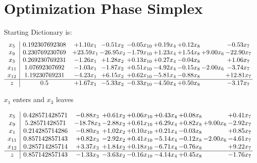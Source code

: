 \documentclass[9pt]{article}
\begin{document}
\section{Optimization Phase Simplex}
Starting Dictionary is:
\[\begin{array}{c| c c@{\hskip 2pt} c@{\hskip 2pt} c@{\hskip 2pt} c@{\hskip 2pt} c@{\hskip 2pt} c@{\hskip 2pt} c@{\hskip 2pt} }
 x_{5}   &  0.192307692308 & +  1.10 x_{1} & -0.51 x_{2} & -0.05 x_{10} & +  0.19 x_{4} & +  0.12 x_{8} &   & -0.53 x_{7}\\
 x_{9}   &  0.230769230769 & + 23.59 x_{1} & -26.95 x_{2} & -1.79 x_{10} & +  1.23 x_{4} & +  1.54 x_{8} & +  9.00 x_{6} & -22.90 x_{7}\\
 x_{3}   &  0.269230769231 & -1.26 x_{1} & +  1.28 x_{2} & +  0.13 x_{10} & +  0.27 x_{4} & -0.04 x_{8} &   & +  1.06 x_{7}\\
 x_{11}   &  1.07692307692 & -1.03 x_{1} & -1.87 x_{2} & +  0.51 x_{10} & -4.92 x_{4} & -0.15 x_{8} & -2.00 x_{6} & -3.74 x_{7}\\
 x_{12}   &  1.19230769231 & -4.23 x_{1} & +  6.15 x_{2} & +  0.62 x_{10} & -5.81 x_{4} & -0.88 x_{8} &   & + 12.81 x_{7}\\
\hline
z    &  0.5 & +  1.67 x_{1} & -5.33 x_{2} & -0.33 x_{10} & -4.50 x_{4} & +  0.50 x_{8} &   & -3.17 x_{7}\\
\end{array}\]


 $ x_{1} $ enters and $ x_{3} $ leaves 

 \[\begin{array}{c| c c@{\hskip 2pt} c@{\hskip 2pt} c@{\hskip 2pt} c@{\hskip 2pt} c@{\hskip 2pt} c@{\hskip 2pt} c@{\hskip 2pt} }
 x_{5}   &  0.428571428571 & -0.88 x_{3} & +  0.61 x_{2} & +  0.06 x_{10} & +  0.43 x_{4} & +  0.08 x_{8} &   & +  0.41 x_{7}\\
 x_{9}   &  5.28571428571 & -18.78 x_{3} & -2.88 x_{2} & +  0.61 x_{10} & +  6.29 x_{4} & +  0.82 x_{8} & +  9.00 x_{6} & -2.92 x_{7}\\
 x_{1}   &  0.214285714286 & -0.80 x_{3} & +  1.02 x_{2} & +  0.10 x_{10} & +  0.21 x_{4} & -0.03 x_{8} &   & +  0.85 x_{7}\\
 x_{11}   &  0.857142857143 & +  0.82 x_{3} & -2.92 x_{2} & +  0.41 x_{10} & -5.14 x_{4} & -0.12 x_{8} & -2.00 x_{6} & -4.61 x_{7}\\
 x_{12}   &  0.285714285714 & +  3.37 x_{3} & +  1.84 x_{2} & +  0.18 x_{10} & -6.71 x_{4} & -0.76 x_{8} &   & +  9.22 x_{7}\\
\hline
z    &  0.857142857143 & -1.33 x_{3} & -3.63 x_{2} & -0.16 x_{10} & -4.14 x_{4} & +  0.45 x_{8} &   & -1.76 x_{7}\\
\end{array}\]
\end{document}
